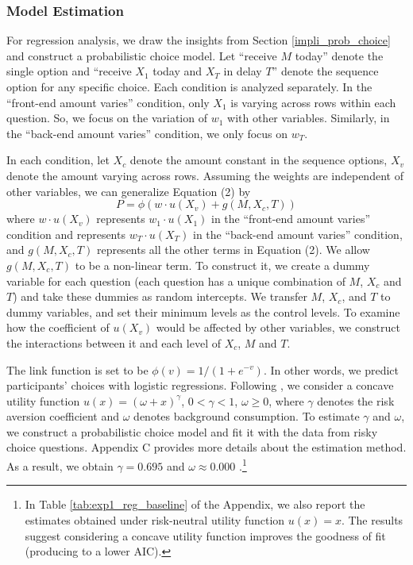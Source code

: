 \documentclass[
  12pt,
]{article}
\begin{document}
\hypertarget{model-estimation}{%
\subsubsection{Model Estimation}\label{model-estimation}}

For regression analysis, we draw the insights from Section
\ref{impli_prob_choice} and construct a probabilistic choice model. Let
``receive \(M\) today'' denote the single option and ``receive \(X_1\)
today and \(X_T\) in delay \(T\)'' denote the sequence option for any
specific choice. Each condition is analyzed separately. In the
``front-end amount varies'' condition, only \(X_1\) is varying across
rows within each question. So, we focus on the variation of \(w_1\) with
other variables. Similarly, in the ``back-end amount varies'' condition,
we only focus on \(w_T\).

In each condition, let \(X_c\) denote the amount constant in the
sequence options, \(X_v\) denote the amount varying across rows.
Assuming the weights are independent of other variables, we can
generalize Equation (2) by\[ P = \phi(w\cdot u(X_v)+g(M,X_c,T)) \]where
\(w\cdot u(X_v)\) represents \(w_1\cdot u(X_1)\) in the ``front-end
amount varies'' condition and represents \(w_T\cdot u(X_T)\) in the
``back-end amount varies'' condition, and \(g(M,X_c,T)\) represents all
the other terms in Equation (2). We allow \(g(M,X_c,T)\) to be a
non-linear term. To construct it, we create a dummy variable for each
question (each question has a unique combination of \(M\), \(X_c\) and
\(T\)) and take these dummies as random intercepts. We transfer \(M\),
\(X_c\), and \(T\) to dummy variables, and set their minimum levels as
the control levels. To examine how the coefficient of \(u(X_v)\) would
be affected by other variables, we construct the interactions between it
and each level of \(X_c\), \(M\) and \(T\).

The link function is set to be \(\phi(v)=1/(1+e^{-v})\). In other words,
we predict participants' choices with logistic regressions. Following
\citet{andersen2008eliciting}, we consider a concave utility function
\(u(x)=(\omega+x)^\gamma\), \(0<\gamma<1\), \(\omega\geq0\), where
\(\gamma\) denotes the risk aversion coefficient and \(\omega\) denotes
background consumption. To estimate \(\gamma\) and \(\omega\), we
construct a probabilistic choice model and fit it with the data from
risky choice questions. Appendix C provides more details about the
estimation method. As a result, we obtain \(\gamma=0.695\) and
\(\omega\approx 0.000\) .\footnote{In Table \ref{tab:exp1_reg_baseline}
  of the Appendix, we also report the estimates obtained under
  risk-neutral utility function \(u(x)=x\). The results suggest
  considering a concave utility function improves the goodness of fit
  (producing to a lower AIC).}
\end{document}
